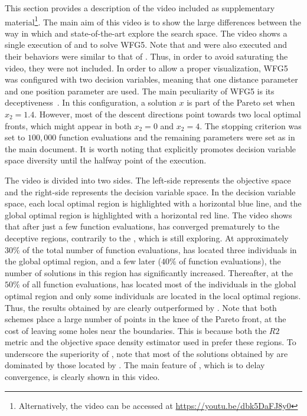 This section provides a description of the video included as supplementary material\footnote{Alternatively, the video can be accessed 
at \url{https://youtu.be/dbk5DaFJ8y0}}.
%
The main aim of this video is to show the large differences between the way in which \VSDMOEA{} and state-of-the-art \MOEAS{} 
explore the search space.
%
The video shows a single execution of \VSDMOEA{} and \RMOEA{} to solve WFG5.
%
Note that \NSGAII{} and \MOEAD{} were also executed and their behaviors were similar to that of \RMOEA{}.
%
Thus, in order to avoid saturating the video, they were not included.
%
In order to allow a proper visualization, WFG5 was configured with two decision variables, meaning that one distance parameter
and one position parameter are used.
%
The main peculiarity of WFG5 is its deceptiveness~\citep{Joel:WFG}.
%
In this configuration, a solution $x$ is part of the Pareto set when $x_2 = 1.4$.
%
However, most of the descent directions point towards two local optimal fronts, which might appear in both $x_2 = 0$ and $x_2 = 4$.
%
The stopping criterion was set to $100,000$ function evaluations and the remaining parameters were set as in the main document.
%
It is worth noting that \VSDMOEA{} explicitly promotes decision variable space diversity until the halfway point of the execution.

The video is divided into two sides.
%
The left-side represents the objective space and the right-side represents the decision variable space.
%
In the decision variable space, each local optimal region is highlighted with a horizontal blue line, and the global optimal region is highlighted 
with a horizontal red line.
%
The video shows that after just a few function evaluations, \RMOEA{} has converged prematurely to the deceptive regions, 
contrarily to the \VSDMOEA{}, which is still exploring.
%
At approximately $30\%$ of the total number of function evaluations, \VSDMOEA{} has 
located three individuals in the global optimal region, and a few later ($40\%$ of function evaluations),
the number of solutions in this region has significantly increased.
%
Thereafter, at the $50\%$ of all function evaluations, \VSDMOEA{} has located most of the individuals in the global optimal region and only 
some individuals are located in the local optimal regions.
%
Thus, the results obtained by \RMOEA{} are clearly outperformed by \VSDMOEA{}.
%
Note that both schemes place a large number of points in the knee of the Pareto front, at the cost of leaving some holes near the boundaries.
%
This is because both the $R2$ metric and the objective space density estimator used in \VSDMOEA{} prefer these regions.
%
To underscore the superiority of \VSDMOEA{}, note that most of the solutions obtained by \RMOEA{} are dominated by those 
located by \VSDMOEA{}.
%
The main feature of \VSDMOEA{}, which is to delay convergence, is clearly shown in this video.

